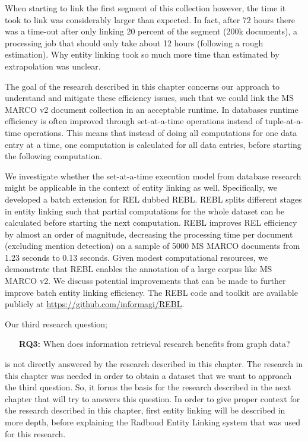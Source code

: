 When starting to link the first segment of this collection however, the time it took to link was considerably larger than expected. In fact, after 72 hours there was a time-out after only linking 20 percent of the segment (200k documents), a processing job that should only take about 12 hours (following a rough estimation). Why entity linking took so much more time than estimated by extrapolation was unclear. 

The goal of the research described in this chapter concerns our approach to understand and mitigate these efficiency issues, such that we could link the MS MARCO v2 document collection in an acceptable runtime. 
In databases runtime efficiency is often improved through set-at-a-time operations instead of tuple-at-a-time operations. This means that instead of doing all computations for one data entry at a time, one computation is calculated for all data entries, before starting the following computation. 

We investigate whether the set-at-a-time execution model from database research might be applicable in the context of entity linking as well. Specifically, we developed a batch extension for REL dubbed REBL. REBL splits different stages in entity linking such that partial computations for the whole dataset can be calculated before starting the next computation.
REBL improves REL efficiency by almost an order of magnitude, decreasing the processing time per document (excluding mention detection) on a sample of 5000 MS MARCO documents from 1.23 seconds to 0.13 seconds. Given modest computational resources, we demonstrate that REBL enables the annotation of a large corpus like MS MARCO v2. We discuss potential improvements that can be made to further improve batch entity linking efficiency. The REBL code and toolkit are available publicly at \url{https://github.com/informagi/REBL}.

Our third research question; 
\begin{itemize}
	\item[\textbf{RQ3:}] When does information retrieval research benefits from graph data?
\end{itemize} 
is not directly answered by the research described in this chapter. The research in this chapter was needed in order to obtain a dataset that we want to approach the third question. So, it forms the basis for the research described in the next chapter that will try to answers this question. In order to give proper context for the research described in this chapter, first entity linking will be described in more depth, before explaining the Radboud Entity Linking system that was used for this research. 


